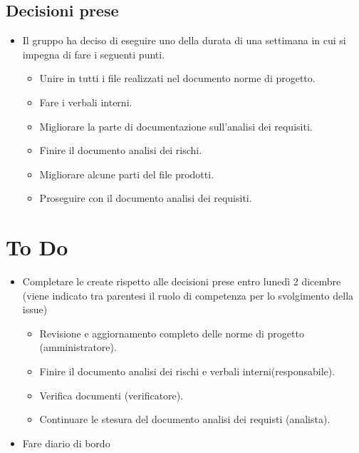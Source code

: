 \documentclass[a4paper, 12pt]{article}
\begin{document}
\subsection{Decisioni prese}
\begin{itemize}
    \item Il gruppo ha deciso di eseguire uno  della durata di una settimana in cui si impegna di fare i seguenti punti.
    \begin{itemize}
        \item Unire in  tutti i file realizzati nel documento norme di progetto.
        \item Fare i verbali interni.
        \item Migliorare la parte di documentazione sull'analisi dei requisiti.
        \item Finire il documento analisi dei rischi.
        \item Migliorare alcune parti del file prodotti.
        \item Proseguire con il documento analisi dei requisiti.
    \end{itemize}
\end{itemize}

\section{To Do}
    \begin{itemize}
        \item Completare le  create rispetto alle decisioni prese entro lunedì 2 dicembre (viene indicato tra parentesi il ruolo di competenza per lo svolgimento della issue)
        \begin{itemize}
            \item Revisione e aggiornamento completo delle norme di progetto (amministratore).
            \item Finire il documento analisi dei rischi e verbali interni(responsabile).
            \item Verifica documenti (verificatore).
            \item Continuare le stesura del documento analisi dei requisti (analista).
        \end{itemize}
        \item Fare diario di bordo
    \end{itemize}
\end{document}
